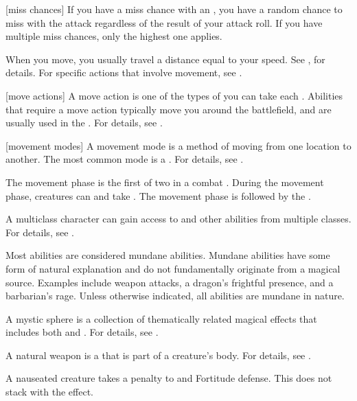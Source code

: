 [miss chances] If you have a miss chance with an , you have a random chance to miss with the attack regardless of the result of your attack roll.
If you have multiple miss chances, only the highest one applies.

 When you move, you usually travel a distance equal to your speed.
See , for details.
For specific actions that involve movement, see .

[move actions] A move action is one of the types of  you can take each .
Abilities that require a move action typically move you around the battlefield, and are usually used in the .
For details, see .

[movement modes] A movement mode is a method of moving from one location to another.
The most common mode is a .
For details, see .

 The movement phase is the first of two  in a combat .
During the movement phase, creatures can  and take .
The movement phase is followed by the .

 A multiclass character can gain access to  and other abilities from multiple classes.
For details, see .

 Most abilities are considered mundane abilities.
Mundane abilities have some form of natural explanation and do not fundamentally originate from a magical source.
Examples include weapon attacks, a dragon's frightful presence, and a barbarian's rage.
Unless otherwise indicated, all abilities are mundane in nature.

 A mystic sphere is a collection of thematically related magical effects that includes both  and .
For details, see .

 A natural weapon is a  that is part of a creature's body.
For details, see .

 A nauseated creature takes a  penalty to  and Fortitude defense.
This does not stack with the  effect.


